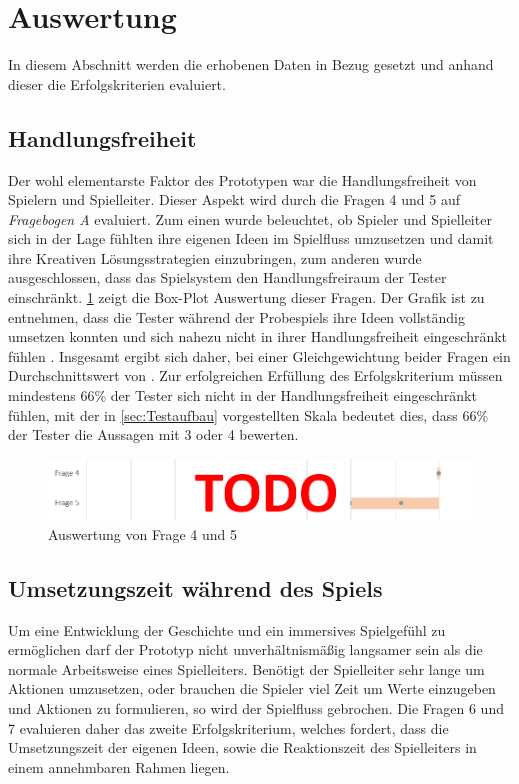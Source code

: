 \section{Auswertung}
\label{sec:Auswertung}

In diesem Abschnitt werden die erhobenen Daten in Bezug gesetzt und anhand dieser die Erfolgskriterien evaluiert.


\subsection{Handlungsfreiheit}
\label{sec:Handlungsfreiheit}
Der wohl elementarste Faktor des Prototypen war die Handlungsfreiheit von Spielern und Spielleiter. Dieser Aspekt wird durch die Fragen 4 und 5 auf \emph{Fragebogen A} evaluiert. Zum einen wurde beleuchtet, ob Spieler und Spielleiter sich in der Lage fühlten ihre eigenen Ideen im Spielfluss umzusetzen und damit ihre Kreativen Lösungsstrategien einzubringen, zum anderen wurde ausgeschlossen, dass das Spielsystem den Handlungsfreiraum der Tester einschränkt.\newline
\ref{fig:questions_4_5} zeigt die Box-Plot Auswertung dieser Fragen. Der Grafik ist zu entnehmen, dass die Tester während der Probespiels ihre Ideen vollständig umsetzen  konnten und sich nahezu nicht in ihrer Handlungsfreiheit eingeschränkt fühlen . Insgesamt ergibt sich daher, bei einer Gleichgewichtung beider Fragen ein Durchschnittswert von . Zur erfolgreichen Erfüllung des Erfolgskriterium müssen mindestens 66\% der Tester sich nicht in der Handlungsfreiheit eingeschränkt fühlen, mit der in \ref{sec:Testaufbau} vorgestellten Skala bedeutet dies, dass 66\% der Tester die Aussagen mit 3 oder 4 bewerten. 

\begin{figure}
	\centering
		\includegraphics[width=1.00\textwidth]{media/2questions_temp.png}
	\caption{Auswertung von Frage 4 und 5}
	\label{fig:questions_4_5}
\end{figure}
	

\subsection{Umsetzungszeit während des Spiels}
\label{sec:Umsetzungszeit}
Um eine Entwicklung der Geschichte und ein immersives Spielgefühl zu ermöglichen darf der Prototyp nicht unverhältnismäßig langsamer sein als die normale Arbeitsweise eines Spielleiters. Benötigt der Spielleiter sehr lange um Aktionen umzusetzen, oder brauchen die Spieler viel Zeit um Werte einzugeben und Aktionen zu formulieren, so wird der Spielfluss gebrochen. Die Fragen 6 und 7 evaluieren daher das zweite Erfolgskriterium, welches fordert, dass die Umsetzungszeit der eigenen Ideen, sowie die Reaktionszeit des Spielleiters in einem annehmbaren Rahmen liegen.

